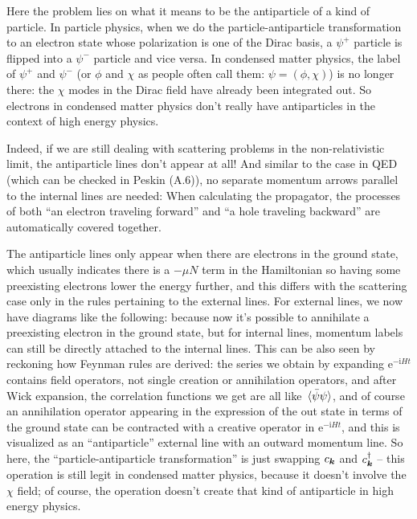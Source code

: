 \documentclass[hyperref, a4paper]{report}
\newcommand*{\ii}{\mathrm{i}}
\newcommand*{\ee}{\mathrm{e}}
\begin{document}
Here the problem lies on what it means to be the antiparticle of a kind of particle.
In particle physics,
when we do the particle-antiparticle transformation to an electron state 
whose polarization is one of the Dirac basis,
a $\psi^+$ particle is flipped into a $\psi^-$ particle and vice versa.
In condensed matter physics, the label of $\psi^+$ and $\psi^-$
(or $\phi$ and $\chi$ as people often call them:
$\psi = (\phi, \chi)$) is no longer there:
the $\chi$ modes in the Dirac field have already been integrated out.
So electrons in condensed matter physics don't really have antiparticles 
in the context of high energy physics.

Indeed, if we are still dealing with scattering problems in the non-relativistic limit,
the antiparticle lines don't appear at all!
And similar to the case in QED (which can be checked in Peskin (A.6)), 
no separate momentum arrows parallel to the internal lines are needed:
When calculating the propagator, 
the processes of both ``an electron traveling forward'' and ``a hole traveling backward''
are automatically covered together.

The antiparticle lines only appear when there are electrons in the ground state,
which usually indicates there is a $-\mu N$ term in the Hamiltonian
so having some preexisting electrons lower the energy further,
and this differs with the scattering case only in the rules pertaining to the external lines.
For external lines, we now have diagrams like the following:
%
because now it's possible to annihilate a preexisting electron in the ground state,
but for internal lines, momentum labels can still be directly attached to the internal lines.
This can be also seen by reckoning how Feynman rules are derived:
the series we obtain by expanding $\ee^{- \ii H t}$ 
contains field operators, not single creation or annihilation operators,
and after Wick expansion,
the correlation functions we get are all like $\expval*{\bar{\psi} \psi}$,
and of course an annihilation operator appearing 
in the expression of the out state in terms of the ground state 
can be contracted with a creative operator in $\ee^{- \ii H t}$,
and this is visualized as an ``antiparticle'' external line 
with an outward momentum line.
So here, the ``particle-antiparticle transformation''
is just swapping $c_{\vb*{k}}$ and $c_{\vb*{k}}^\dagger$
-- this operation is still legit in condensed matter physics,
because it doesn't involve the $\chi$ field;
of course, the operation doesn't create that kind of antiparticle in high energy physics.
\end{document}

